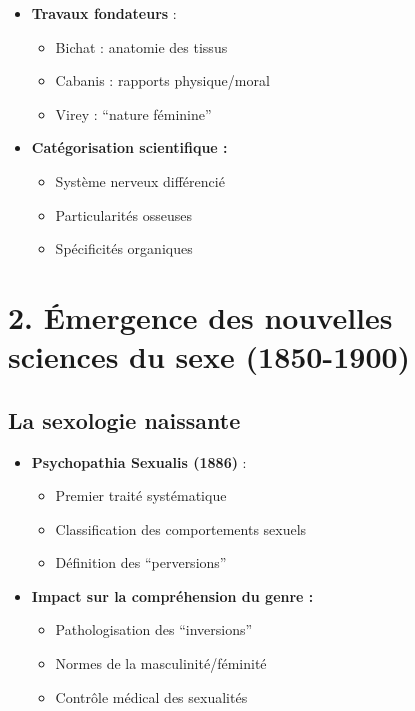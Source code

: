 \documentclass[
  letterpaper,
  DIV=11,
  numbers=noendperiod]{scrreprt}
\providecommand{\tightlist}{%
  \setlength{\itemsep}{0pt}\setlength{\parskip}{0pt}}\usepackage{longtable,booktabs,array}
\begin{document}
\begin{itemize}
\tightlist
\item
  \textbf{Travaux fondateurs} :

  \begin{itemize}
  \tightlist
  \item
    Bichat : anatomie des tissus
  \item
    Cabanis : rapports physique/moral
  \item
    Virey : ``nature féminine''
  \end{itemize}
\item
  \textbf{Catégorisation scientifique :}

  \begin{itemize}
  \tightlist
  \item
    Système nerveux différencié
  \item
    Particularités osseuses
  \item
    Spécificités organiques
  \end{itemize}
\end{itemize}

\section{2. Émergence des nouvelles sciences du sexe
(1850-1900)}\label{uxe9mergence-des-nouvelles-sciences-du-sexe-1850-1900}

\subsection{La sexologie naissante}\label{la-sexologie-naissante}

\begin{itemize}
\tightlist
\item
  \textbf{Psychopathia Sexualis (1886)} :

  \begin{itemize}
  \tightlist
  \item
    Premier traité systématique
  \item
    Classification des comportements sexuels
  \item
    Définition des ``perversions''
  \end{itemize}
\item
  \textbf{Impact sur la compréhension du genre :}

  \begin{itemize}
  \tightlist
  \item
    Pathologisation des ``inversions''
  \item
    Normes de la masculinité/féminité
  \item
    Contrôle médical des sexualités
  \end{itemize}
\end{itemize}
\end{document}
